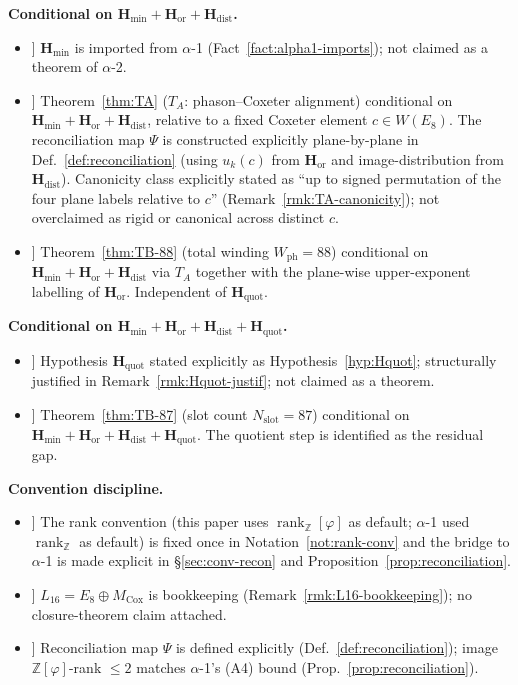 \documentclass[11pt, a4paper]{amsart}
\theoremstyle{definition}
\newcommand{\Z}{\mathbb{Z}}
\newcommand{\rk}{\operatorname{rank}}
\newcommand{\Hmin}{\mathbf{H}_{\min}}
\newcommand{\Hor}{\mathbf{H}_{\mathrm{or}}}
\newcommand{\Hdist}{\mathbf{H}_{\mathrm{dist}}}
\newcommand{\Hquot}{\mathbf{H}_{\mathrm{quot}}}
\newcommand{\Ophi}{\mathbb{Z}[\varphi]}
\newcommand{\Mcox}{M_{\mathrm{Cox}}}
\newcommand{\Wph}{W_{\mathrm{ph}}}
\newcommand{\Nslot}{N_{\mathrm{slot}}}
\begin{document}
\textbf{Conditional on $\Hmin + \Hor + \Hdist$.}
\begin{itemize}
\item[[6]] $\Hmin$ is imported from $\alpha$-1
  (Fact~\ref{fact:alpha1-imports}); not claimed as a
  theorem of $\alpha$-2.
\item[[7]] Theorem~\ref{thm:TA} ($T_A$: phason--Coxeter
  alignment) conditional on $\Hmin + \Hor + \Hdist$,
  relative to a fixed Coxeter element $c \in W(E_8)$. The
  reconciliation map $\Psi$ is constructed explicitly
  plane-by-plane in Def.~\ref{def:reconciliation} (using
  $u_k(c)$ from $\Hor$ and image-distribution from
  $\Hdist$). Canonicity class explicitly stated as ``up to
  signed permutation of the four plane labels relative to
  $c$'' (Remark~\ref{rmk:TA-canonicity}); not overclaimed
  as rigid or canonical across distinct $c$.
\item[[8]] Theorem~\ref{thm:TB-88} (total winding $\Wph =
  88$) conditional on $\Hmin + \Hor + \Hdist$ via $T_A$
  together with the plane-wise upper-exponent labelling of
  $\Hor$. Independent of $\Hquot$.
\end{itemize}

\textbf{Conditional on $\Hmin + \Hor + \Hdist + \Hquot$.}
\begin{itemize}
\item[[9]] Hypothesis $\Hquot$ stated explicitly as
  Hypothesis~\ref{hyp:Hquot}; structurally justified in
  Remark~\ref{rmk:Hquot-justif}; not claimed as a theorem.
\item[[10]] Theorem~\ref{thm:TB-87} (slot count $\Nslot =
  87$) conditional on $\Hmin + \Hor + \Hdist + \Hquot$. The quotient
  step is identified as the residual gap.
\end{itemize}

\textbf{Convention discipline.}
\begin{itemize}
\item[[11]] The rank convention (this paper uses
  $\rk_\Ophi$ as default; $\alpha$-1 used $\rk_\Z$ as
  default) is fixed once in
  Notation~\ref{not:rank-conv} and the bridge to $\alpha$-1
  is made explicit in \S\ref{sec:conv-recon} and
  Proposition~\ref{prop:reconciliation}.
\item[[12]] $L_{16} = E_8 \oplus \Mcox$ is bookkeeping
  (Remark~\ref{rmk:L16-bookkeeping}); no closure-theorem
  claim attached.
\item[[13]] Reconciliation map $\Psi$ is defined explicitly
  (Def.~\ref{def:reconciliation}); image $\Ophi$-rank
  $\leq 2$ matches $\alpha$-1's (A4) bound
  (Prop.~\ref{prop:reconciliation}).
\end{itemize}
\end{document}
